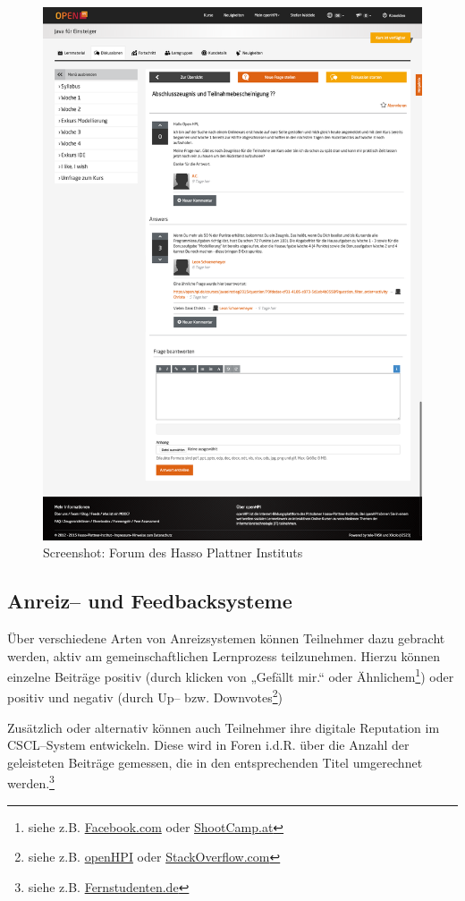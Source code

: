 \begin{figure}[p]
\begin{center}
\includegraphics[width=\textwidth]{hpiforum.png}
\caption{Screenshot: Forum des Hasso Plattner Instituts}
\label{fig:hpi}
\end{center}
\end{figure}

\subsection{Anreiz– und Feedbacksysteme} %
\label{sub:infentives}

Über verschiedene Arten von Anreizsystemen können Teilnehmer dazu gebracht werden, aktiv am gemeinschaftlichen Lernprozess teilzunehmen. Hierzu können einzelne Beiträge positiv (durch klicken von „Gefällt mir.“ oder Ähnlichem\footnote{siehe z.B. \url{Facebook.com} oder \url{ShootCamp.at}}) oder positiv und negativ (durch Up– bzw. Downvotes\footnote{siehe z.B. \url{openHPI} oder \url{StackOverflow.com}})

Zusätzlich oder alternativ können auch Teilnehmer ihre digitale Reputation im \ac{CSCL}–System entwickeln. Diese wird in Foren i.d.R. über die Anzahl der geleisteten Beiträge gemessen, die in den entsprechenden Titel umgerechnet werden.\footnote{siehe z.B. \url{Fernstudenten.de}}

